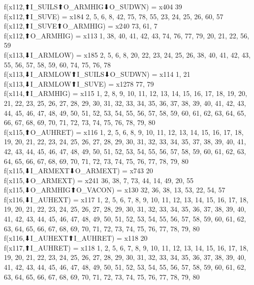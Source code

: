 f(x112,⬆I_SUILS⬆O_ARMHIG⬇O_SUDWN) = x404 {39} \\
f(x112,⬆I_SUVE) = x184 {2, 5, 6, 8, 42, 75, 78, 55, 23, 24, 25, 26, 60, 57} \\
f(x112,⬆I_SUVE⬆O_ARMHIG) = x240 {73, 61, 7} \\
f(x112,⬆O_ARMHIG) = x113 {1, 38, 40, 41, 42, 43, 74, 76, 77, 79, 20, 21, 22, 56, 59} \\
f(x113,⬇I_ARMLOW) = x185 {2, 5, 6, 8, 20, 22, 23, 24, 25, 26, 38, 40, 41, 42, 43, 55, 56, 57, 58, 59, 60, 74, 75, 76, 78} \\
f(x113,⬇I_ARMLOW⬆I_SUILS⬇O_SUDWN) = x114 {1, 21} \\
f(x113,⬇I_ARMLOW⬆I_SUVE) = x1278 {77, 79} \\
f(x114,⬆I_ARMHIG) = x115 {1, 2, 8, 9, 10, 11, 12, 13, 14, 15, 16, 17, 18, 19, 20, 21, 22, 23, 25, 26, 27, 28, 29, 30, 31, 32, 33, 34, 35, 36, 37, 38, 39, 40, 41, 42, 43, 44, 45, 46, 47, 48, 49, 50, 51, 52, 53, 54, 55, 56, 57, 58, 59, 60, 61, 62, 63, 64, 65, 66, 67, 68, 69, 70, 71, 72, 73, 74, 75, 76, 78, 79, 80} \\
f(x115,⬆O_AUHRET) = x116 {1, 2, 5, 6, 8, 9, 10, 11, 12, 13, 14, 15, 16, 17, 18, 19, 20, 21, 22, 23, 24, 25, 26, 27, 28, 29, 30, 31, 32, 33, 34, 35, 37, 38, 39, 40, 41, 42, 43, 44, 45, 46, 47, 48, 49, 50, 51, 52, 53, 54, 55, 56, 57, 58, 59, 60, 61, 62, 63, 64, 65, 66, 67, 68, 69, 70, 71, 72, 73, 74, 75, 76, 77, 78, 79, 80} \\
f(x115,⬇I_ARMEXT⬇O_ARMEXT) = x743 {20} \\
f(x115,⬇O_ARMEXT) = x241 {36, 38, 7, 73, 44, 14, 49, 20, 55} \\
f(x115,⬇O_ARMHIG⬆O_VACON) = x130 {32, 36, 38, 13, 53, 22, 54, 57} \\
f(x116,⬇I_AUHEXT) = x117 {1, 2, 5, 6, 7, 8, 9, 10, 11, 12, 13, 14, 15, 16, 17, 18, 19, 20, 21, 22, 23, 24, 25, 26, 27, 28, 29, 30, 31, 32, 33, 34, 35, 36, 37, 38, 39, 40, 41, 42, 43, 44, 45, 46, 47, 48, 49, 50, 51, 52, 53, 54, 55, 56, 57, 58, 59, 60, 61, 62, 63, 64, 65, 66, 67, 68, 69, 70, 71, 72, 73, 74, 75, 76, 77, 78, 79, 80} \\
f(x116,⬇I_AUHEXT⬆I_AUHRET) = x118 {20} \\
f(x117,⬆I_AUHRET) = x118 {1, 2, 5, 6, 7, 8, 9, 10, 11, 12, 13, 14, 15, 16, 17, 18, 19, 20, 21, 22, 23, 24, 25, 26, 27, 28, 29, 30, 31, 32, 33, 34, 35, 36, 37, 38, 39, 40, 41, 42, 43, 44, 45, 46, 47, 48, 49, 50, 51, 52, 53, 54, 55, 56, 57, 58, 59, 60, 61, 62, 63, 64, 65, 66, 67, 68, 69, 70, 71, 72, 73, 74, 75, 76, 77, 78, 79, 80} \\
